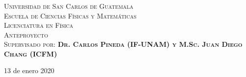 \documentclass[11pt, spanish, letterpage]{article}
\begin{document}
\begin{titlepage}
        \textsc{\LARGE Universidad de San Carlos de Guatemala\\ Escuela de Ciencias Físicas y Matemáticas\\ Licenciatura en Física}\\[2cm]
        
        \textsc{\Large Anteproyecto}\\[2cm]
        
        \textsc{\Large Supervisado por: \textbf{Dr. Carlos Pineda (IF-UNAM) y M.Sc. Juan Diego Chang (ICFM)}}
                                                                                                              

        \vfill\vfill\vfill %
        \vfill\vfill\vfill

        {\large 13 de enero 2020} %




        \vfill %

\end{titlepage}
\end{document}
